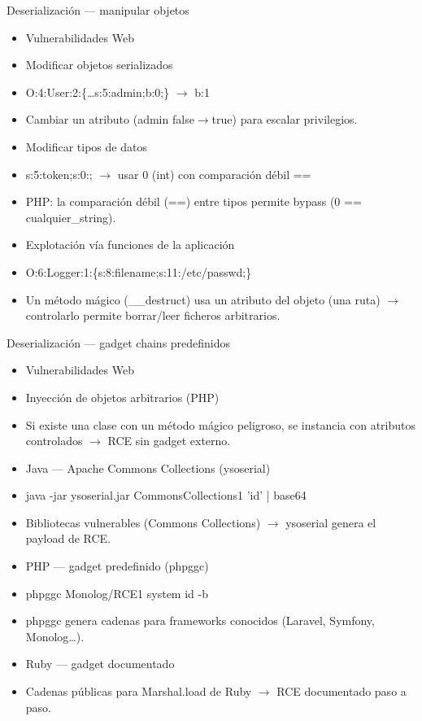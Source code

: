 \documentclass[aspectratio=169,10pt]{beamer}
\begin{document}
\begin{frame}[allowframebreaks]{Deserialización --- manipular objetos}
\small
  \begin{itemize}
  \item Vulnerabilidades Web
  \item Modificar objetos serializados
  \item O:4:\textquotedbl{}User\textquotedbl{}:2:\{\dots{}s:5:\textquotedbl{}admin\textquotedbl{};b:0;\} $\rightarrow$ b:1
  \item Cambiar un atributo (admin false$\rightarrow$true) para escalar privilegios.
  \item Modificar tipos de datos
  \item s:5:\textquotedbl{}token\textquotedbl{};s:0:\textquotedbl{}\textquotedbl{}; $\rightarrow$ usar 0 (int) con comparación débil ==
  \item PHP: la comparación débil (==) entre tipos permite bypass (0 == \textquotedbl{}cualquier\_string\textquotedbl{}).
  \item Explotación vía funciones de la aplicación
  \item O:6:\textquotedbl{}Logger\textquotedbl{}:1:\{s:8:\textquotedbl{}filename\textquotedbl{};s:11:\textquotedbl{}/etc/passwd\textquotedbl{};\}
  \item Un método mágico (\_\_destruct) usa un atributo del objeto (una ruta) $\rightarrow$ controlarlo permite borrar/leer ficheros arbitrarios.
  \end{itemize}
\end{frame}

\begin{frame}[allowframebreaks]{Deserialización --- gadget chains predefinidos}
\small
  \begin{itemize}
  \item Vulnerabilidades Web
  \item Inyección de objetos arbitrarios (PHP)
  \item Si existe una clase con un método mágico peligroso, se instancia con atributos controlados $\rightarrow$ RCE sin gadget externo.
  \item Java --- Apache Commons Collections (ysoserial)
  \item java -jar ysoserial.jar CommonsCollections1 'id' | base64
  \item Bibliotecas vulnerables (Commons Collections) $\rightarrow$ ysoserial genera el payload de RCE.
  \item PHP --- gadget predefinido (phpggc)
  \item phpggc Monolog/RCE1 system id -b
  \item phpggc genera cadenas para frameworks conocidos (Laravel, Symfony, Monolog\dots{}).
  \item Ruby --- gadget documentado
  \item Cadenas públicas para Marshal.load de Ruby $\rightarrow$ RCE documentado paso a paso.
  \end{itemize}
\end{frame}
\end{document}
